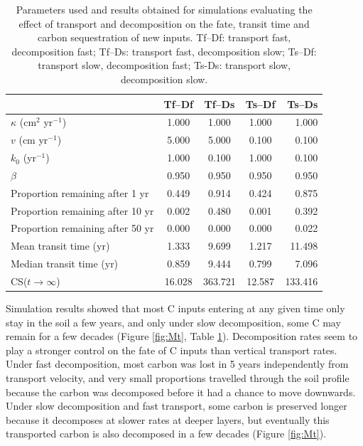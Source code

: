 \documentclass[11pt, oneside, a4paper]{article}   	%
\begin{document}
\begin{table}[h]
   \centering
   \caption{Parameters used and results obtained for simulations evaluating the effect of transport and decomposition on the fate, transit time and carbon sequestration of new inputs. Tf--Df: transport fast, decomposition fast; Tf--Ds: transport fast, decomposition slow; Ts--Df: transport slow, decomposition fast; Ts-Ds: transport slow, decomposition slow.}
   \begin{tabular}{@{} lcccr @{}} %
\toprule
 & Tf--Df & Tf--Ds & Ts--Df & Ts--Ds\\
\midrule
$\kappa$ (cm$^2$ yr$^{-1}$) & 1.000 & 1.000 & 1.000 & 1.000\\
$v$ (cm yr$^{-1}$) & 5.000 & 5.000 & 0.100 & 0.100\\
$k_0$ (yr$^{-1}$) & 1.000 & 0.100 & 1.000 & 0.100\\
$\beta$ & 0.950 & 0.950 & 0.950 & 0.950\\
Proportion remaining after 1 yr & 0.449   & 0.914 & 0.424  & 0.875\\
Proportion remaining after 10 yr & 0.002  & 0.480 & 0.001 &  0.392 \\
Proportion remaining after 50 yr & 0.000  & 0.000 & 0.000  & 0.022 \\
Mean transit time (yr) & 1.333  & 9.699 & 1.217 & 11.498 \\
Median transit time (yr) & 0.859  & 9.444 & 0.799  & 7.096 \\
CS($t \to \infty$) & 16.028 & 363.721 &12.587 &133.416 \\
\bottomrule
\end{tabular}
   \label{tab:simulationSetup}
\end{table}

Simulation results showed that most C inputs entering at any given time only stay in the soil a few years, and only under slow decomposition, some C may remain for a few decades (Figure \ref{fig:Mt}, Table \ref{tab:simulationSetup}). Decomposition rates seem to play a stronger control on the fate of C inputs than vertical transport rates. Under fast decomposition, most carbon was lost in 5 years independently from transport velocity, and very small proportions travelled through the soil profile because the carbon was decomposed before it had a chance to move downwards. Under slow decomposition and fast transport, some carbon is preserved longer because it decomposes at slower rates at deeper layers, but eventually this transported carbon is also decomposed in a few decades (Figure \ref{fig:Mt}).
\end{document}

